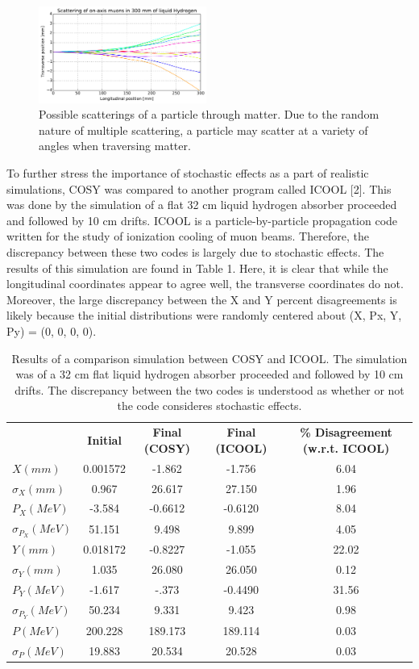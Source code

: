 \documentclass{jacow}
\begin{document}
\begin{figure}[h!]
\centering
\includegraphics[width=0.49\textwidth]{figures/p10tr.pdf}
\caption{Possible scatterings of a particle through matter. Due to the random nature of multiple scattering, a particle may scatter at a variety of angles when traversing matter.}
\end{figure}

To further stress the importance of stochastic effects as a part of realistic simulations, COSY was compared to another program called ICOOL [2]. This was done by the simulation of a flat 32 cm liquid hydrogen absorber proceeded and followed by 10 cm drifts. ICOOL is a particle-by-particle propagation code written for the study of ionization cooling of muon beams. Therefore, the discrepancy between these two codes is largely due to stochastic effects. The results of this simulation are found in Table 1. Here, it is clear that while the longitudinal coordinates appear to agree well, the transverse coordinates do not. Moreover, the large discrepancy between the X and Y percent disagreements is likely because the initial distributions were randomly centered about (X, Px, Y, Py) = (0, 0, 0, 0).

\begin{table}[hbt]
   \centering
   \caption{Results of a comparison simulation between COSY and ICOOL. The simulation was of a 32 cm flat liquid hydrogen absorber proceeded and followed by 10 cm drifts. The discrepancy between the two codes is understood as whether or not the code consideres stochastic effects.}
   \begin{tabular}{lcccc}
       \toprule
			 \textbf{}            & \textbf{Initial} 	& \textbf{Final (COSY)} & \textbf{Final (ICOOL)} 	& \textbf{\% Disagreement (w.r.t. ICOOL)} \\ 
          $ X (mm)$      &0.001572 &-1.862 &-1.756 &6.04\\
	$\sigma_X (mm)$&0.967&26.617&27.150&1.96\\
	$P_X (MeV)$&-3.584&-0.6612&-0.6120&8.04\\
	$\sigma_{P_X} (MeV)$&51.151&9.498&9.899&4.05\\
	$Y (mm)$&0.018172&-0.8227&-1.055&22.02\\
	$\sigma_Y (mm)$&1.035&26.080&26.050&0.12\\
	$P_Y (MeV)$&-1.617&-.373&-0.4490&31.56\\
	$\sigma_{P_Y} (MeV)$&50.234&9.331&9.423&0.98\\
	$P (MeV)$&200.228&189.173&189.114&0.03\\
	$\sigma_P (MeV)$&19.883&20.534&20.528&0.03\\
       \bottomrule
   \end{tabular}
   \label{l2ea4-t1}
\end{table}
\end{document}
